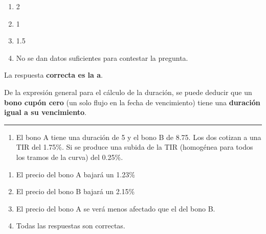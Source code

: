 \documentclass[
  letterpaper,
  DIV=11,
  numbers=noendperiod]{scrartcl}
\providecommand{\tightlist}{%
  \setlength{\itemsep}{0pt}\setlength{\parskip}{0pt}}\usepackage{longtable,booktabs,array}
\begin{document}
\begin{enumerate}
\def\labelenumi{\alph{enumi}.}
\item
  2
\item
  1
\item
  1.5
\item
  No se dan datos suficientes para contestar la pregunta.
\end{enumerate}

\begin{tcolorbox}[enhanced jigsaw, colframe=quarto-callout-note-color-frame, opacityback=0, colback=white, leftrule=.75mm, left=2mm, breakable, arc=.35mm, rightrule=.15mm, toprule=.15mm, bottomrule=.15mm]
\begin{minipage}[t]{5.5mm}
\textcolor{quarto-callout-note-color}{\faInfo}
\end{minipage}%
\begin{minipage}[t]{\textwidth - 5.5mm}

La respuesta \textbf{correcta es la a}.

De la expresión general para el cálculo de la duración, se puede deducir
que un \textbf{bono cupón cero} (un solo flujo en la fecha de
vencimiento) tiene una \textbf{duración igual a su vencimiento}.

\end{minipage}%
\end{tcolorbox}

\begin{center}\rule{0.5\linewidth}{0.5pt}\end{center}

\begin{enumerate}
\def\labelenumi{\arabic{enumi}.}
\setcounter{enumi}{2}
\tightlist
\item
  El bono A tiene una duración de 5 y el bono B de 8.75. Los dos cotizan
  a una TIR del 1.75\%. Si se produce una subida de la TIR (homogénea
  para todos los tramos de la curva) del 0.25\%.
\end{enumerate}

\begin{enumerate}
\def\labelenumi{\alph{enumi}.}
\item
  El precio del bono A bajará un 1.23\%
\item
  El precio del bono B bajará un 2.15\%
\item
  El precio del bono A se verá menos afectado que el del bono B.
\item
  Todas las respuestas son correctas.
\end{enumerate}
\end{document}
